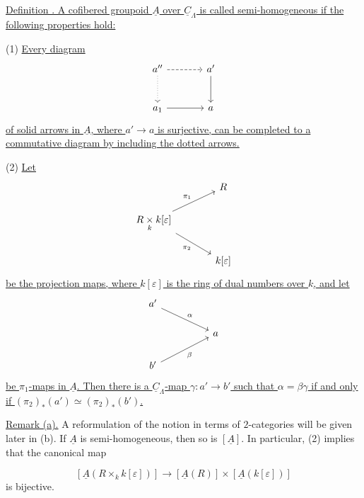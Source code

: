 \underline{Definition . A cofibered groupoid $\underline A$ over
$\underline C_\Lambda$ is called semi-homogeneous if the following
properties hold:}

(1) \underline{Every diagram}
\[
\begin{tikzcd}[row sep=large,column sep=large]
a'' \arrow[r,dashed] \arrow[d,dotted] & a' \arrow[d] \\
a_1 \arrow[r] & a
\end{tikzcd}
\]
\underline{of solid arrows in $\underline A$, where
$a'\longrightarrow a$ is surjective, can be completed to a commutative
diagram by including the dotted arrows.}

(2) \underline{Let}
\[
\begin{tikzcd}[column sep=large]
& R \\
R\underset{k}{\times}k[\varepsilon]
 \arrow[ur,"\pi_1"] \arrow[dr,"\pi_2"'] & \\
& k[\varepsilon]
\end{tikzcd}
\]
\underline{be the projection maps, where $k[\varepsilon]$ is the ring
of dual numbers over $k$, and let}
\[
\begin{tikzcd}[column sep=huge]
a' \arrow[dr,"\alpha"] & \\
& a \\
b' \arrow[ur,"\beta"'] &
\end{tikzcd}
\]
\underline{be $\pi_1$-maps in $\underline A$. Then there is a
$\underline C_\Lambda$-map $\gamma:a'\longrightarrow b'$ such that
$\alpha=\beta\gamma$ if and only if
$(\pi_2)_*(a')\simeq(\pi_2)_*(b')$.}

\underline{Remark (a).} A reformulation of the notion in terms of
$2$-categories will be given later in (b). If $\underline A$ is
semi-homogeneous, then so is $[\underline A]$. In particular, (2)
implies that the canonical map


\[
 [\underline A(R\times_k k[\varepsilon])]
 \longrightarrow
 [\underline A(R)]\times[\underline A(k[\varepsilon])]
\]
is bijective.


